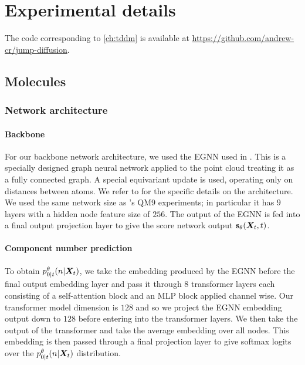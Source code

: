 \section{Experimental details}
\label{sec:tddm-ExperimentDetails}
The code corresponding to \cref{ch:tddm} is available at \url{https://github.com/andrew-cr/jump-diffusion}.

\subsection{Molecules}

\subsubsection{Network architecture}
\paragraph{Backbone}
For our backbone network architecture, we used the EGNN used in \citet{hoogeboom2022equivariant}. This is a specially designed graph neural network applied to the point cloud treating it as a fully connected graph. A special equivariant update is used, operating only on distances between atoms. We refer to \citet{hoogeboom2022equivariant} for the specific details on the architecture. We used the same network size as \citet{hoogeboom2022equivariant}'s QM9 experiments; in particular it has $9$ layers with a hidden node feature size of $256$. The output of the EGNN is fed into a final output projection layer to give the score network output ${\mathbf{s}}_\theta({\bm{X}}_t, t)$.

\paragraph{Component number prediction}
To obtain $p_{0|t}^\theta(n | {\bm{X}}_t)$,  we take the embedding produced by the EGNN before the final output embedding layer and pass it through 8 transformer layers each consisting of a self-attention block and an MLP block applied channel wise. Our transformer model dimension is $128$ and so we project the EGNN embedding output down to $128$ before entering into the transformer layers. We then take the output of the transformer and take the average embedding over all nodes. This embedding is then passed through a final projection layer to give softmax logits over the $p_{0|t}^\theta(n | {\bm{X}}_t)$ distribution.

